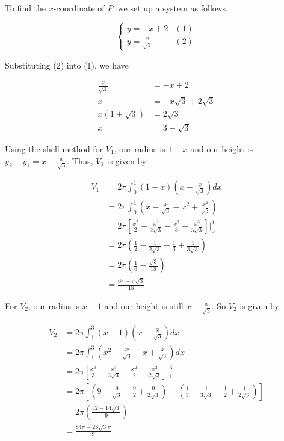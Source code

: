 \documentclass{article}
\begin{document}
    To find the $x$-coordinate of $P$, we set up a system as follows.

    \[
        \begin{cases}
            y = -x+2 & (1)\\
            y = \frac{x}{\sqrt{3}} & (2)
        \end{cases}
    \]

    Substituting (2) into (1), we have

    \begin{align*}
        \frac{x}{\sqrt{3}}  &= -x+2 \\
        x                   &= -x\sqrt{3}+2\sqrt{3} \\
        x(1+\sqrt{3})       &= 2\sqrt{3} \\
        x                   &= 3-\sqrt{3}
    \end{align*}

    Using the shell method for $V_1$, our radius is $1-x$ and our height is $y_2-y_1=x-\frac{x}{\sqrt{3}}$. Thus, $V_1$ is given by

    \begin{align*}
        V_1 &= 2\pi\int_0^1 (1-x)\left(x-\frac{x}{\sqrt{3}}\right)dx \\
            &= 2\pi\int_0^1 \left(x-\frac{x}{\sqrt{3}}-x^2+\frac{x^2}{\sqrt{3}}\right) \\
            &= 2\pi\left[\frac{x^2}{2}-\frac{x^2}{2\sqrt{3}}-\frac{x^3}{3}+\frac{x^3}{3\sqrt{3}}\right]\Bigg|_0^1 \\
            &= 2\pi\left(\frac{1}{2}-\frac{1}{2\sqrt{3}}-\frac{1}{3}+\frac{1}{3\sqrt{3}}\right) \\
            &= 2\pi\left(\frac{1}{6}-\frac{\sqrt{3}}{18}\right) \\
            &= \frac{6\pi-\pi\sqrt{3}}{18}
    \end{align*}

    For $V_2$, our radius is $x-1$ and our height is still $x-\frac{x}{\sqrt{3}}$. So $V_2$ is given by

    \begin{align*}
        V_2 &= 2\pi\int_1^3 (x-1)\left(x-\frac{x}{\sqrt{3}}\right)dx \\
            &= 2\pi\int_1^3\left(x^2-\frac{x^2}{\sqrt{3}}-x+\frac{x}{\sqrt{3}}\right)dx \\
            &= 2\pi\left[\frac{x^3}{3}-\frac{x^3}{3\sqrt{3}}-\frac{x^2}{2}+\frac{x^2}{2\sqrt{3}}\right]\Bigg|_1^3 \\
            &= 2\pi\left[\left(9-\frac{9}{\sqrt{3}}-\frac{9}{2}+\frac{9}{2\sqrt{3}}\right) - \left(\frac{1}{3}-\frac{1}{3\sqrt{3}}-\frac{1}{2} + \frac{1}{2\sqrt{3}}\right)\right] \\
            &= 2\pi\left(\frac{42-14\sqrt{3}}{9}\right) \\
            &= \frac{84\pi-28\sqrt{3}\pi}{9}
    \end{align*}
\end{document}
